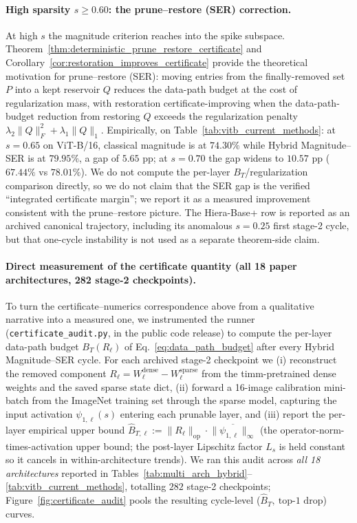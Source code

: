 \documentclass[11pt]{article}
\theoremstyle{plain}
\theoremstyle{definition}
\theoremstyle{remark}
\newcommand{\1}{\mathbf{1}}
\begin{document}
\paragraph{High sparsity \(s\ge 0.60\): the prune--restore (SER) correction.}  At high \(s\) the magnitude criterion reaches into the spike subspace.  Theorem~\ref{thm:deterministic_prune_restore_certificate} and Corollary~\ref{cor:restoration_improves_certificate} provide the theoretical motivation for prune--restore (SER): moving entries from the finally-removed set \(P\) into a kept reservoir \(Q\) reduces the data-path budget at the cost of regularization mass, with restoration certificate-improving when the data-path-budget reduction from restoring \(Q\) exceeds the regularization penalty \(\lambda_2\|Q\|_F^2+\lambda_1\|Q\|_1\).  Empirically, on Table~\ref{tab:vitb_current_methods}: at \(s=0.65\) on ViT-B/16, classical magnitude is at \(74.30\%\) while Hybrid Magnitude--SER is at \(79.95\%\), a gap of \(5.65\) pp; at \(s=0.70\) the gap widens to \(10.57\) pp (\(67.44\%\) vs \(78.01\%\)).  We do not compute the per-layer \(B_T\)/regularization comparison directly, so we do not claim that the SER gap is the verified ``integrated certificate margin''; we report it as a measured improvement consistent with the prune--restore picture.  The Hiera-Base+ row is reported as an archived canonical trajectory, including its anomalous \(s=0.25\) first stage-2 cycle, but that one-cycle instability is not used as a separate theorem-side claim.

\paragraph{Direct measurement of the certificate quantity (all 18 paper architectures, 282 stage-2 checkpoints).}
To turn the certificate--numerics correspondence above from a qualitative narrative into a measured one, we instrumented the runner (\texttt{certificate\_audit.py}, in the public code release) to compute the per-layer data-path budget \(B_T(R_\ell)\) of Eq.~\eqref{eq:data_path_budget} after every Hybrid Magnitude--SER cycle.  For each archived stage-2 checkpoint we (i) reconstruct the removed component \(R_\ell = W_\ell^{\text{dense}} - W_\ell^{\text{sparse}}\) from the timm-pretrained dense weights and the saved sparse state dict, (ii) forward a 16-image calibration mini-batch from the ImageNet training set through the sparse model, capturing the input activation \(\psi_{1,\ell}(s)\) entering each prunable layer, and (iii) report the per-layer empirical upper bound \(\hat B_{T,\ell} := \|R_\ell\|_{\mathrm{op}}\cdot\overline{\|\psi_{1,\ell}\|_\infty}\) (the operator-norm-times-activation upper bound; the post-layer Lipschitz factor \(L_s\) is held constant so it cancels in within-architecture trends).  We ran this audit across \emph{all 18 architectures} reported in Tables~\ref{tab:multi_arch_hybrid}--\ref{tab:vitb_current_methods}, totalling \(282\) stage-2 checkpoints; Figure~\ref{fig:certificate_audit} pools the resulting cycle-level (\(\hat B_T,\ \text{top-1 drop}\)) curves.
\end{document}
